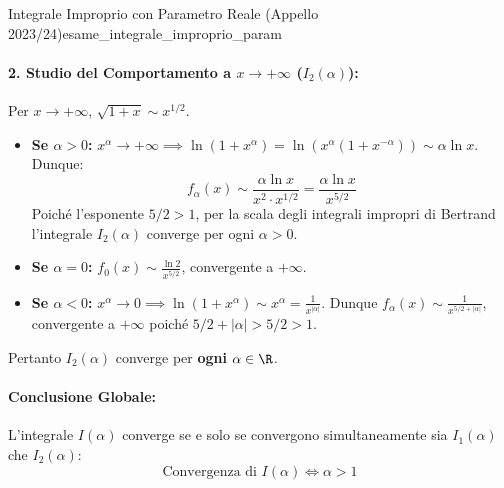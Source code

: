\begin{esempio}{Integrale Improprio con Parametro Reale (Appello 2023/24)}{esame_integrale_improprio_param}
\paragraph{2. Studio del Comportamento a $x \to +\infty$ ($I_2(\alpha)$):}
Per $x \to +\infty$, $\sqrt{1 + x} \sim x^{1/2}$.
\begin{itemize}
    \item \textbf{Se $\alpha > 0$:} $x^\alpha \to +\infty \implies \ln(1 + x^\alpha) = \ln(x^\alpha(1 + x^{-\alpha})) \sim \alpha\ln x$.
    Dunque:
    \[
        f_\alpha(x) \sim \frac{\alpha\ln x}{x^2 \cdot x^{1/2}} = \frac{\alpha\ln x}{x^{5/2}}
    \]
    Poiché l'esponente $5/2 > 1$, per la scala degli integrali impropri di Bertrand l'integrale $I_2(\alpha)$ converge per ogni $\alpha > 0$.
    \item \textbf{Se $\alpha = 0$:} $f_0(x) \sim \frac{\ln 2}{x^{5/2}}$, convergente a $+\infty$.
    \item \textbf{Se $\alpha < 0$:} $x^\alpha \to 0 \implies \ln(1 + x^\alpha) \sim x^\alpha = \frac{1}{x^{|\alpha|}}$.
    Dunque $f_\alpha(x) \sim \frac{1}{x^{5/2 + |\alpha|}}$, convergente a $+\infty$ poiché $5/2 + |\alpha| > 5/2 > 1$.
\end{itemize}
Pertanto $I_2(\alpha)$ converge per \textbf{ogni} $\alpha \in \R$.

\paragraph{Conclusione Globale:}
L'integrale $I(\alpha)$ converge se e solo se convergono simultaneamente sia $I_1(\alpha)$ che $I_2(\alpha)$:
\[
    \text{Convergenza di } I(\alpha) \iff \alpha > 1
\]
\end{esempio}

